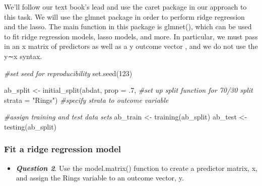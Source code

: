 \documentclass[
]{article}
\newenvironment{Shaded}{\begin{snugshade}}{\end{snugshade}}
\newcommand{\AttributeTok}[1]{\textcolor[rgb]{0.77,0.63,0.00}{#1}}
\newcommand{\CommentTok}[1]{\textcolor[rgb]{0.56,0.35,0.01}{\textit{#1}}}
\newcommand{\DecValTok}[1]{\textcolor[rgb]{0.00,0.00,0.81}{#1}}
\newcommand{\FunctionTok}[1]{\textcolor[rgb]{0.00,0.00,0.00}{#1}}
\newcommand{\NormalTok}[1]{#1}
\newcommand{\OtherTok}[1]{\textcolor[rgb]{0.56,0.35,0.01}{#1}}
\newcommand{\SpecialCharTok}[1]{\textcolor[rgb]{0.00,0.00,0.00}{#1}}
\newcommand{\StringTok}[1]{\textcolor[rgb]{0.31,0.60,0.02}{#1}}
\providecommand{\tightlist}{%
  \setlength{\itemsep}{0pt}\setlength{\parskip}{0pt}}
\begin{document}
We'll follow our text book's lead and use the caret package in our
approach to this task. We will use the glmnet package in order to
perform ridge regression and the lasso. The main function in this
package is glmnet(), which can be used to fit ridge regression models,
lasso models, and more. In particular, we must pass in an x matrix of
predictors as well as a y outcome vector , and we do not use the y∼x
syntax.

\begin{Shaded}
\begin{Highlighting}[]
\CommentTok{\#set seed for reproducibility}
\FunctionTok{set.seed}\NormalTok{(}\DecValTok{123}\NormalTok{)}

\NormalTok{ab\_split }\OtherTok{\textless{}{-}} \FunctionTok{initial\_split}\NormalTok{(abdat, }\AttributeTok{prop =}\NormalTok{ .}\DecValTok{7}\NormalTok{, }\CommentTok{\#set up split function for 70/30 split}
                          \AttributeTok{strata =} \StringTok{"Rings"}\NormalTok{) }\CommentTok{\#specify strata to outcome variable}

\CommentTok{\#assign training and test data sets}
\NormalTok{ab\_train }\OtherTok{\textless{}{-}} \FunctionTok{training}\NormalTok{(ab\_split)}
\NormalTok{ab\_test }\OtherTok{\textless{}{-}} \FunctionTok{testing}\NormalTok{(ab\_split)}
\end{Highlighting}
\end{Shaded}

\hypertarget{fit-a-ridge-regression-model}{%
\subsubsection{Fit a ridge regression
model}\label{fit-a-ridge-regression-model}}

\begin{itemize}
\tightlist
\item
  \textbf{\emph{Question 2}}. Use the model.matrix() function to create
  a predictor matrix, x, and assign the Rings variable to an outcome
  vector, y.
\end{itemize}

\begin{Shaded}
\end{Shaded}
\end{document}
